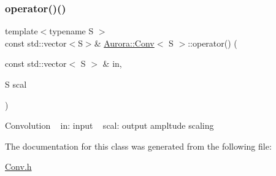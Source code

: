 \subsubsection{\texorpdfstring{operator()()}{operator()()}}
{\footnotesize\ttfamily template$<$typename S $>$ \\
const std\+::vector$<$S$>$\& \hyperlink{class_aurora_1_1_conv}{Aurora\+::\+Conv}$<$ S $>$\+::operator() (\begin{DoxyParamCaption}\item[{const std\+::vector$<$ S $>$ \&}]{in,  }\item[{S}]{scal }\end{DoxyParamCaption})\hspace{0.3cm}{\ttfamily [inline]}}

Convolution ~\newline
in\+: input ~\newline
scal\+: output ampltude scaling 

The documentation for this class was generated from the following file\+:\begin{DoxyCompactItemize}
\item 
\hyperlink{_conv_8h}{Conv.\+h}\end{DoxyCompactItemize}
